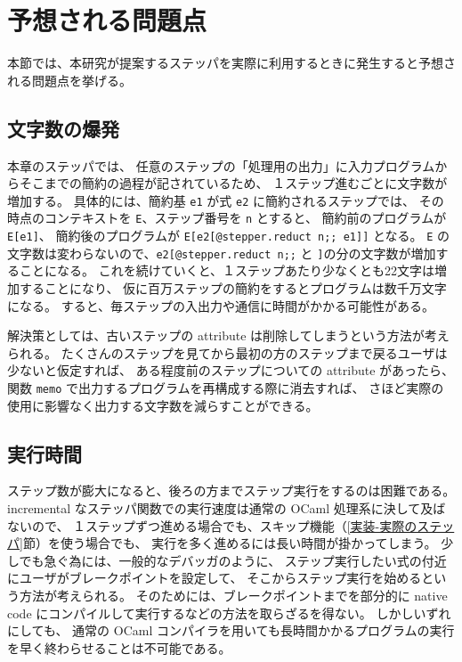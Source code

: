 \section{予想される問題点}
本節では、本研究が提案するステッパを実際に利用するときに発生すると予想される問題点を挙げる。

\subsection{文字数の爆発}
本章のステッパでは、
任意のステップの「処理用の出力」に入力プログラムからそこまでの簡約の過程が記されているため、
１ステップ進むごとに文字数が増加する。
具体的には、簡約基 \texttt{e1} が式 \texttt{e2} に簡約されるステップでは、
その時点のコンテキストを \texttt{E}、ステップ番号を \texttt{n} とすると、
簡約前のプログラムが \texttt{E[e1]}、
簡約後のプログラムが \texttt{E[e2[@stepper.reduct n;; e1]]} となる。
\texttt{E} の文字数は変わらないので、\texttt{e2[@stepper.reduct n;;}
と \texttt{]}の分の文字数が増加することになる。
これを続けていくと、１ステップあたり少なくとも22文字は増加することになり、
仮に百万ステップの簡約をするとプログラムは数千万文字になる。
すると、毎ステップの入出力や通信に時間がかかる可能性がある。

解決策としては、古いステップの attribute は削除してしまうという方法が考えられる。
たくさんのステップを見てから最初の方のステップまで戻るユーザは少ないと仮定すれば、
ある程度前のステップについての attribute があったら、
関数 \texttt{memo} で出力するプログラムを再構成する際に消去すれば、
さほど実際の使用に影響なく出力する文字数を減らすことができる。

\subsection{実行時間}
\label{予想される問題点-実行時間}

ステップ数が膨大になると、後ろの方までステップ実行をするのは困難である。
incremental なステッパ関数での実行速度は通常の OCaml 処理系に決して及ばないので、
１ステップずつ進める場合でも、スキップ機能（\ref{実装-実際のステッパ}節）を使う場合でも、
実行を多く進めるには長い時間が掛かってしまう。
少しでも急ぐ為には、一般的なデバッガのように、
ステップ実行したい式の付近にユーザがブレークポイントを設定して、
そこからステップ実行を始めるという方法が考えられる。
そのためには、ブレークポイントまでを部分的に native code にコンパイルして実行するなどの方法を取らざるを得ない。
しかしいずれにしても、
通常の OCaml コンパイラを用いても長時間かかるプログラムの実行を早く終わらせることは不可能である。

